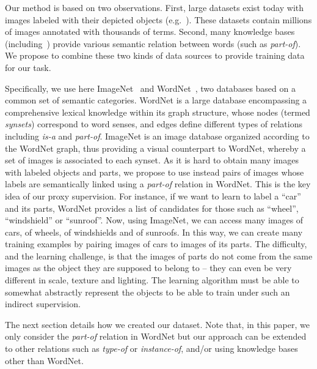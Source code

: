 Our method is based on two observations.
%
First, large datasets exist today with images labeled with their depicted objects (e.g.~\citep{imagenet}).
%
These datasets contain millions of images annotated with thousands of
terms.
%
Second, many knowledge bases (including~\citep{wordnet, freebase, yago})
provide various semantic relation between words (such as \textit{part-of}).
%
We propose to combine these two kinds of data sources to provide
training data for our task.

Specifically, we use here ImageNet~\citep{imagenet} and
WordNet~\citep{wordnet}, two databases based on a common set of
semantic categories.
%
WordNet is a large database encompassing a comprehensive lexical
knowledge within its graph structure, whose nodes (termed {\it
  synsets}) correspond to word senses, and edges define different
types of relations including {\em is-a} and {\em part-of}.
%
ImageNet is an image database organized according to the WordNet graph,
thus providing a visual counterpart to WordNet,
whereby a set of images is associated to each synset.
As it is hard to obtain many images with labeled objects and parts, we
propose to use instead pairs of images whose labels are
semantically linked using a \textit{part-of} relation in WordNet.
%
This is the key idea of our proxy supervision.
%
For instance, if we want to learn to label a ``car'' and its parts,
WordNet provides a list of candidates for those such as ``wheel'',
``windshield'' or ``sunroof''.
%
Now, using ImageNet, we can access many images of cars, of wheels, of
windshields and of sunroofs. In this way, we can create many training examples
by pairing images of cars to images of its parts.
%
The difficulty, and the learning challenge, is that the images of
parts do not come from the same images as the object they are supposed
to belong to -- they can even be very different in scale, texture and
lighting. The learning algorithm must be able to somewhat abstractly
represent the objects to be able to train under such an indirect
supervision.

The next section details how we created our dataset. Note that, in
this paper, we only consider the \textit{part-of} relation in WordNet
but our approach can be extended to other relations such as
\textit{type-of} or \textit{instance-of}, and/or using knowledge bases other than WordNet.


